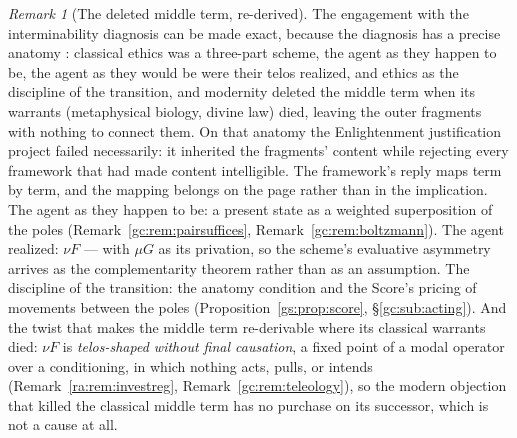 \documentclass[11pt]{article}
\numberwithin{equation}{section}
\theoremstyle{plain}
\theoremstyle{definition}
\theoremstyle{remark}
\newtheorem{remark}[theorem]{Remark}
\begin{document}
\begin{remark}[The deleted middle term, re-derived]\label{gs:rem:middleterm}
The engagement with the interminability diagnosis can be made exact,
because the diagnosis has a precise anatomy \cite{MacIntyre81}:
classical ethics was a three-part scheme, the agent as they happen
to be, the agent as they would be were their telos realized, and
ethics as the discipline of the transition, and modernity deleted
the middle term when its warrants (metaphysical biology, divine law)
died, leaving the outer fragments with nothing to connect them. On
that anatomy the Enlightenment justification project failed
necessarily: it inherited the fragments' content while rejecting
every framework that had made content intelligible. The framework's
reply maps term by term, and the mapping belongs on the page rather
than in the implication. The agent as they happen to be: a present
state as a weighted superposition of the poles
(Remark~\ref{gc:rem:pairsuffices}, Remark~\ref{gc:rem:boltzmann}).
The agent realized: $\nu F$ --- with $\mu G$ as its privation, so
the scheme's evaluative asymmetry arrives as the complementarity
theorem rather than as an assumption. The discipline of the
transition: the anatomy condition and the Score's pricing of
movements between the poles (Proposition~\ref{gs:prop:score},
\S\ref{gc:sub:acting}). And the twist that makes the middle term
re-derivable where its classical warrants died: $\nu F$ is
\emph{telos-shaped without final causation}, a fixed point of a
modal operator over a conditioning, in which nothing acts, pulls, or
intends (Remark~\ref{ra:rem:investreg},
Remark~\ref{gc:rem:teleology}), so the modern objection that
killed the classical middle term has no purchase on its successor,
which is not a cause at all.


\end{remark}
\end{document}
